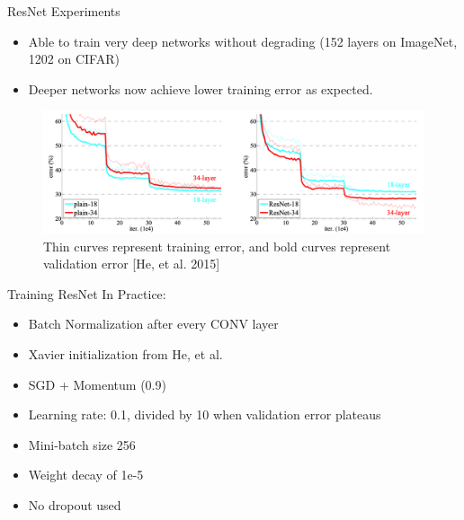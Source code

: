 \documentclass[serif, aspectratio=169]{beamer}
\begin{document}
\begin{frame}{ResNet Experiments}
	\begin{itemize}
		\item Able to train very deep networks without degrading (152 layers on ImageNet, 1202 on CIFAR)
		\item Deeper networks now achieve lower training error as expected.
	\end{itemize}
	\begin{figure}[htpb]
		\begin{center}
			\includegraphics[keepaspectratio, scale=0.2]{pic/ResNetExp}
			\caption*{\scriptsize Thin curves represent training error, and bold curves represent validation error [He, et al. 2015]}
		\end{center}
	\end{figure}
\end{frame}

\begin{frame}{Training ResNet In Practice:}
	\begin{itemize}
		\item Batch Normalization after every CONV layer
		\item Xavier initialization from He, et al.
		\item SGD + Momentum (0.9)
		\item Learning rate: 0.1, divided by 10 when validation error plateaus
		\item Mini-batch size 256
		\item Weight decay of 1e-5
		\item No dropout used
	\end{itemize}
\end{frame}
\end{document}
